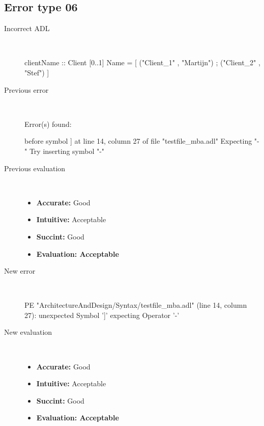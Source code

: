 \hrulefill

\subsection{Error type 06}
  \begin{description}
  \item[Incorrect ADL]~\\
\begin{adl}
clientName :: Client [0..1] Name =
    [ ("Client_1"      , "Martijn")
    ; ("Client_2"      , "Stef")
    ]\end{adl}
  \item[Previous error]~\\
\begin{haskell}
Error(s) found:

before symbol ] at line 14, column 27 of file "testfile_mba.adl"
Expecting "-"
Try inserting symbol "-"
\end{haskell}
  \item[Previous evaluation]~\\
    \begin{itemize}
    \item \textbf{Accurate:} Good
    \item \textbf{Intuitive:} Acceptable
    \item \textbf{Succint:} Good
    \item \textbf{Evaluation: Acceptable}
    \end{itemize}
  \item[New error]~\\
\begin{haskell}
PE "ArchitectureAndDesign/Syntax/testfile_mba.adl" (line 14, column 27):
unexpected Symbol ']'
expecting Operator '-'\end{haskell}
  \item[New evaluation]~\\
    \begin{itemize}
    \item \textbf{Accurate:} Good
    \item \textbf{Intuitive:} Acceptable
    \item \textbf{Succint:} Good
    \item \textbf{Evaluation: Acceptable
}
    \end{itemize}
  \end{description}

\hrulefill

